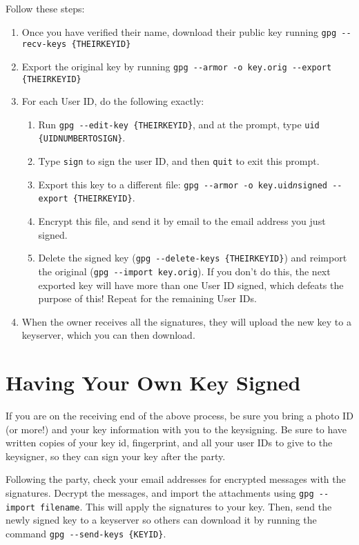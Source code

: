 \documentclass{article}
\begin{document}
Follow these steps:

\begin{enumerate}
\item Once you have verified their name, download their public key
  running \texttt{gpg -{}-recv-keys \{THEIRKEYID\}}
\item Export the original key by running \texttt{gpg -{}-armor -o
    key.orig -{}-export \{THEIRKEYID\}}
\item For each User ID, do the following exactly:
  \begin{enumerate}
  \item Run \texttt{gpg -{}-edit-key \{THEIRKEYID\}}, and at the
    prompt, type \texttt{uid \{UIDNUMBERTOSIGN\}}.
  \item Type \texttt{sign} to sign the user ID, and then \texttt{quit}
    to exit this prompt.
  \item Export this key to a different file: \texttt{gpg -{}-armor -o
      key.uid\textit{n}signed -{}-export \{THEIRKEYID\}}.
  \item Encrypt this file, and send it by email to the email address
    you just signed.
  \item Delete the signed key (\texttt{gpg -{}-delete-keys
      \{THEIRKEYID\}}) and reimport the original (\texttt{gpg
      -{}-import key.orig}).  If you don't do this, the next exported
    key will have more than one User ID signed, which defeats the
    purpose of this!  Repeat for the remaining User IDs.
  \end{enumerate}
\item When the owner receives all the signatures, they will upload the
  new key to a keyserver, which you can then download.
\end{enumerate}

\section*{Having Your Own Key Signed}
If you are on the receiving end of the above process, be sure you
bring a photo ID (or more!) and your key information with you to the
keysigning.  Be sure to have written copies of your key id,
fingerprint, and all your user IDs to give to the keysigner, so they
can sign your key after the party.

Following the party, check your email addresses for encrypted messages
with the signatures.  Decrypt the messages, and import the attachments
using \texttt{gpg -{}-import filename}.  This will apply the
signatures to your key.  Then, send the newly signed key to a
keyserver so others can download it by running the command \texttt{gpg
  -{}-send-keys \{KEYID\}}.
\end{document}

